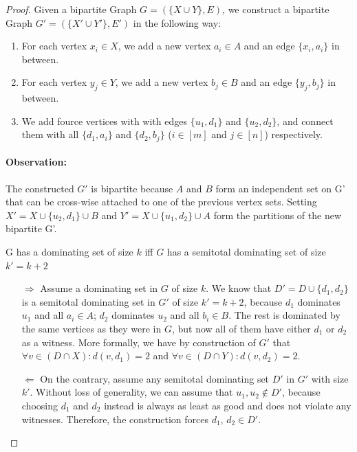 \begin{proof}
    Given a bipartite Graph $G = ( \{X \cup Y\}, E)$, we construct a bipartite Graph $G' = (\{X' \cup Y'\},E')$ in the following way:
    \begin{enumerate}
        \item For each vertex $x_i \in X$, we add a new vertex $a_i \in A$  and an edge $\{x_i, a_i\}$ in between. 
        \item For each vertex $y_j \in Y$, we add a new vertex $b_j \in B$ and an edge $\{y_j, b_j\}$ in between.
        \item We add fource vertices with with edges $\{u_1, d_1\}$ and $\{u_2, d_2\}$, and connect them with all $\{d_1, a_i\}$ and $\{d_2, b_j\}$ ($i \in [m]$ and $j \in [n]$) respectively.
    \end{enumerate}
    \paragraph*{Observation:} The constructed $G'$ is bipartite because $A$ and $B$ form an independent set on G' that can be cross-wise attached to one of the previous vertex sets. Setting  $X' = X \cup \{u_2,d_1\} \cup B$ and $Y' = X \cup \{u_1,d_2\} \cup A$ form the partitions of the new bipartite G'.

    \begin{corollary} G has a dominating set of size $k$ iff $G$ has a semitotal dominating set of size $k' = k + 2$
    \end{corollary} 
    \begin{enumerate}
    \item[$\Rightarrow$] Assume a dominating set in $G$ of size $k$. We know that $D' = D\cup \{d_1,d_2\}$ is a semitotal dominating set in $G'$ of size $k' = k + 2$, because $d_1$ dominates $u_1$ and all $a_i \in A$; $d_2$ dominates $u_2$ and all $b_i \in B$. The rest is dominated by the same vertices as they were in $G$, but now all of them have either $d_1$ or $d_2$ as a witness.
    More formally, we have by construction of $G'$ that $\forall v \in (D \cap X): d(v, d_1) = 2$ and $\forall v \in (D \cap Y): d(v, d_2) = 2$.

    \item[$\Leftarrow$] On the contrary, assume any semitotal dominating set $D'$ in $G'$ with size $k'$. Without loss of generality, we can assume that $u_1, u_2 \notin D'$, because choosing $d_1$ and $d_2$ instead is always as least as good and does not violate any witnesses. Therefore, the construction forces $d_1$, $d_2 \in D'$. 


\end{enumerate}
\end{proof}
